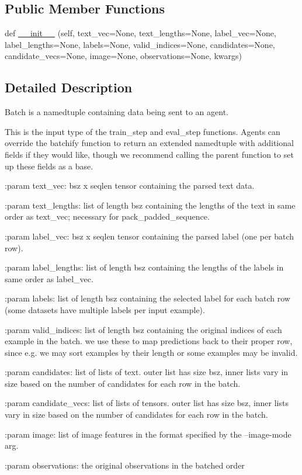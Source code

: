 \subsection*{Public Member Functions}
\begin{DoxyCompactItemize}
\item 
def \hyperlink{classparlai_1_1core_1_1torch__agent_1_1Batch_a6ef9b406e741e455da515aa8f84c798e}{\+\_\+\+\_\+init\+\_\+\+\_\+} (self, text\+\_\+vec=None, text\+\_\+lengths=None, label\+\_\+vec=None, label\+\_\+lengths=None, labels=None, valid\+\_\+indices=None, candidates=None, candidate\+\_\+vecs=None, image=None, observations=None, kwargs)
\end{DoxyCompactItemize}


\subsection{Detailed Description}
\begin{DoxyVerb}Batch is a namedtuple containing data being sent to an agent.

This is the input type of the train_step and eval_step functions.
Agents can override the batchify function to return an extended namedtuple
with additional fields if they would like, though we recommend calling the
parent function to set up these fields as a base.

:param text_vec:
    bsz x seqlen tensor containing the parsed text data.

:param text_lengths:
    list of length bsz containing the lengths of the text in same order as
    text_vec; necessary for pack_padded_sequence.

:param label_vec:
    bsz x seqlen tensor containing the parsed label (one per batch row).

:param label_lengths:
    list of length bsz containing the lengths of the labels in same order as
    label_vec.

:param labels:
    list of length bsz containing the selected label for each batch row (some
    datasets have multiple labels per input example).

:param valid_indices:
    list of length bsz containing the original indices of each example in the
    batch. we use these to map predictions back to their proper row, since e.g.
    we may sort examples by their length or some examples may be invalid.

:param candidates:
    list of lists of text. outer list has size bsz, inner lists vary in size
    based on the number of candidates for each row in the batch.

:param candidate_vecs:
    list of lists of tensors. outer list has size bsz, inner lists vary in size
    based on the number of candidates for each row in the batch.

:param image:
    list of image features in the format specified by the --image-mode arg.

:param observations:
    the original observations in the batched order
\end{DoxyVerb}
 

